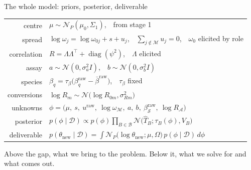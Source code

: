 \documentclass[10pt,aspectratio=169]{beamer}
\newcommand{\Ncal}{\mathcal{N}}
\newcommand{\Mset}{\mathcal{M}}
\newcommand{\Dset}{\mathcal{D}}
\newcommand{\Bset}{\mathcal{B}}
\newcommand{\Tr}{^{\!\top}}
\DeclareMathOperator{\diag}{diag}
\newcommand{\lab}[1]{{\scriptsize\color{gray}#1}}
\begin{document}
\begin{frame}[t]{The whole model: priors, posterior, deliverable}
  \begingroup\small
  \begin{center}
  \begin{tabular}{@{}r@{\ \ }l@{}}
    \lab{centre} & $\mu \sim \Ncal_P(\mu_0,\Sigma_1)$,\ \ from stage 1 \\[5pt]
    \lab{spread} & $\log\omega_j = \log\omega_{0j} + s + u_j$,\ \
      $\textstyle\sum_{j\notin\Mset} u_j = 0$,\ \ $\omega_0$ elicited by role \\[5pt]
    \lab{correlation} & $R = \Lambda\Lambda\Tr + \diag(\psi^2)$,\ \ $\Lambda$ elicited \\[5pt]
    \lab{assay} & $a \sim \Ncal(0,\sigma_a^2 I)$,\ \ $b \sim \Ncal(0,\sigma_b^2 I)$ \\[5pt]
    \lab{species} & $\beta_q = \tau_\beta\big(\beta^{\text{raw}}_q - \bar\beta^{\text{raw}}\big)$,\ \
      $\tau_\beta$ fixed \\[5pt]
    \lab{conversions} & $\log R_m \sim \Ncal\big(\log R_{0m},\sigma_{Rm}^2\big)$ \\[9pt]
    \lab{unknowns} & $\phi = \big(\mu,\ s,\ u^{\text{raw}},\ \log\omega_{\Mset},\
      a,\ b,\ \beta^{\text{raw}}_{\mathcal{S}},\ \log R_{\mathcal{A}}\big)$ \\[5pt]
    \lab{posterior} & $p(\phi\mid\Dset) \propto p(\phi)\prod_{B\in\Bset}
      \Ncal\big(\widehat T_B;\tau_B(\phi),V_B\big)$ \\[5pt]
    \lab{deliverable} & $p(\theta_{\text{new}}\mid\Dset)
      = \int \Ncal_P\big(\log\theta_{\text{new}};\mu,\Omega\big)\,p(\phi\mid\Dset)\,d\phi$ \\
  \end{tabular}
  \end{center}
  \endgroup
  \vfill
  {\small Above the gap, what we bring to the problem. Below it, what we solve
   for and what comes out.\par}
\end{frame}
\end{document}
